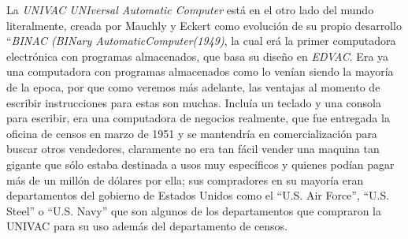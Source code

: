 \documentclass[letterpaper,12pt,oneside]{book}
\begin{document}
		
		La \textit{UNIVAC UNIversal Automatic Computer} está en el otro lado del mundo literalmente, creada por Mauchly y Eckert como evolución de su propio desarrollo 
		``\textit{BINAC (BINary AutomaticComputer(1949)}, la cual erá la primer computadora electrónica con programas almacenados, que basa su diseño en \textit{EDVAC}.
		Era ya una computadora con programas almacenados como lo venían siendo la mayoría de la epoca, por que como veremos más adelante, las
		ventajas al momento de escribir instrucciones para estas son muchas. Incluía un teclado y una consola para escribir, era una computadora de negocios realmente, que
		fue entregada la oficina de censos en marzo de 1951 y se mantendría en comercialización para buscar otros vendedores, claramente no era tan fácil vender una maquina
		tan gigante que sólo estaba destinada a usos muy específicos y quienes podían pagar más de un millón de dólares por ella; sus compradores en su mayoría
		eran departamentos del gobierno de Estados Unidos como el ``U.S. Air Force'', ``U.S. Steel'' o ``U.S. Navy'' que son algunos de los departamentos que
		compraron la UNIVAC para su uso además del departamento de censos.
		
		
		
\end{document}
